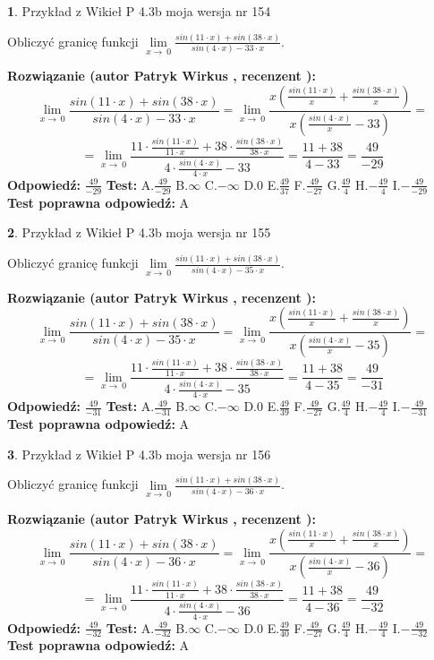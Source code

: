 \documentclass[12pt, a4paper]{article}
\theoremstyle{definition} %
\newtheorem{zad}{}
\newcommand{\zadStart}[1]{\begin{zad}#1\newline}
\newcommand{\zadStop}{\end{zad}}
\newcommand{\rozwStart}[2]{\noindent \textbf{Rozwiązanie (autor #1 , recenzent #2): }\newline}
\newcommand{\rozwStop}{\newline}
\newcommand{\odpStart}{\noindent \textbf{Odpowiedź:}\newline}
\newcommand{\odpStop}{\newline}
\newcommand{\testStart}{\noindent \textbf{Test:}\newline}
\newcommand{\testStop}{\newline}
\newcommand{\kluczStart}{\noindent \textbf{Test poprawna odpowiedź:}\newline}
\newcommand{\kluczStop}{\newline}
\begin{document}
\zadStart{Przykład z Wikieł P 4.3b moja wersja nr 154}


Obliczyć granicę funkcji $\lim\limits_{x\to\ 0}\frac{sin(11 \cdot x)+sin(38 \cdot x)}{sin(4 \cdot x)-33 \cdot x}$.
\zadStop
\rozwStart{Patryk Wirkus}{}
$$\lim\limits_{x\to\ 0}\frac{sin(11 \cdot x)+sin(38 \cdot x)}{sin(4 \cdot x)-33 \cdot x}=\lim\limits_{x\to\ 0}\frac{x(\frac{sin(11 \cdot x)}{x}+\frac{sin(38 \cdot x)}{x})}{x(\frac{sin(4 \cdot x)}{x}-33)}=$$
$$=\lim\limits_{x\to\ 0}\frac{11 \cdot \frac{sin(11 \cdot x)}{11 \cdot x}+38 \cdot \frac{sin(38 \cdot x)}{38 \cdot x}}{4 \cdot \frac{sin(4 \cdot x)}{4 \cdot x}-33}=\frac{11+38}{4-33} = \frac{49}{-29}$$
\rozwStop
\odpStart
$\frac{49}{-29}$
\odpStop
\testStart
A.$\frac{49}{-29}$
B.$\infty$
C.$-\infty$
D.$0$
E.$\frac{49}{37}$
F.$\frac{49}{-27}$
G.$\frac{49}{4}$
H.$-\frac{49}{4}$
I.$-\frac{49}{-29}$
\testStop
\kluczStart
A
\kluczStop



\zadStart{Przykład z Wikieł P 4.3b moja wersja nr 155}


Obliczyć granicę funkcji $\lim\limits_{x\to\ 0}\frac{sin(11 \cdot x)+sin(38 \cdot x)}{sin(4 \cdot x)-35 \cdot x}$.
\zadStop
\rozwStart{Patryk Wirkus}{}
$$\lim\limits_{x\to\ 0}\frac{sin(11 \cdot x)+sin(38 \cdot x)}{sin(4 \cdot x)-35 \cdot x}=\lim\limits_{x\to\ 0}\frac{x(\frac{sin(11 \cdot x)}{x}+\frac{sin(38 \cdot x)}{x})}{x(\frac{sin(4 \cdot x)}{x}-35)}=$$
$$=\lim\limits_{x\to\ 0}\frac{11 \cdot \frac{sin(11 \cdot x)}{11 \cdot x}+38 \cdot \frac{sin(38 \cdot x)}{38 \cdot x}}{4 \cdot \frac{sin(4 \cdot x)}{4 \cdot x}-35}=\frac{11+38}{4-35} = \frac{49}{-31}$$
\rozwStop
\odpStart
$\frac{49}{-31}$
\odpStop
\testStart
A.$\frac{49}{-31}$
B.$\infty$
C.$-\infty$
D.$0$
E.$\frac{49}{39}$
F.$\frac{49}{-27}$
G.$\frac{49}{4}$
H.$-\frac{49}{4}$
I.$-\frac{49}{-31}$
\testStop
\kluczStart
A
\kluczStop



\zadStart{Przykład z Wikieł P 4.3b moja wersja nr 156}


Obliczyć granicę funkcji $\lim\limits_{x\to\ 0}\frac{sin(11 \cdot x)+sin(38 \cdot x)}{sin(4 \cdot x)-36 \cdot x}$.
\zadStop
\rozwStart{Patryk Wirkus}{}
$$\lim\limits_{x\to\ 0}\frac{sin(11 \cdot x)+sin(38 \cdot x)}{sin(4 \cdot x)-36 \cdot x}=\lim\limits_{x\to\ 0}\frac{x(\frac{sin(11 \cdot x)}{x}+\frac{sin(38 \cdot x)}{x})}{x(\frac{sin(4 \cdot x)}{x}-36)}=$$
$$=\lim\limits_{x\to\ 0}\frac{11 \cdot \frac{sin(11 \cdot x)}{11 \cdot x}+38 \cdot \frac{sin(38 \cdot x)}{38 \cdot x}}{4 \cdot \frac{sin(4 \cdot x)}{4 \cdot x}-36}=\frac{11+38}{4-36} = \frac{49}{-32}$$
\rozwStop
\odpStart
$\frac{49}{-32}$
\odpStop
\testStart
A.$\frac{49}{-32}$
B.$\infty$
C.$-\infty$
D.$0$
E.$\frac{49}{40}$
F.$\frac{49}{-27}$
G.$\frac{49}{4}$
H.$-\frac{49}{4}$
I.$-\frac{49}{-32}$
\testStop
\kluczStart
A
\kluczStop
\end{document}
